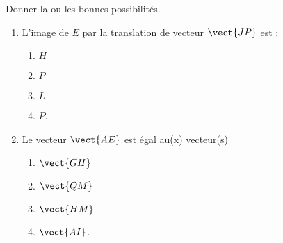 
\begin{exercice}\label{exosmath-0594}

\begin{wrapfigure}{r}{5.0cm}
   \vspace{-0.5cm}        %
   \centering
   
\end{wrapfigure}

Donner la ou les bonnes possibilités.

        \begin{enumerate}
            \item
                L'image de \( E\) par la translation de vecteur \( \vect{ JP }\) est :
                \begin{multicols}{3}
                    \begin{enumerate}
                        \item $H$\item $P$\item \( L\)\item \( P\).
                    \end{enumerate}
                \end{multicols}
            \item
                Le vecteur \( \vect{ AE }\) est égal au(x) vecteur(s)
                \begin{multicols}{3}
                    \begin{enumerate}
                        \item \( \vect{ GH }\)\item \( \vect{ QM }\)\item \( \vect{ HM }\)\item \( \vect{ AI }\).
                    \end{enumerate}
                \end{multicols}
        \end{enumerate}


\end{exercice}
